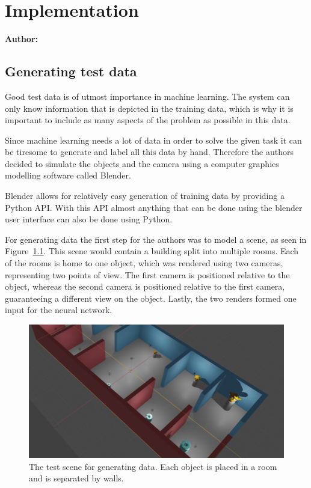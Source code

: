 \chapter{Implementation}

\textbf{Author: } 

\section{Generating test data}
Good test data is of utmost importance in machine learning. The system can only know information that is depicted in the training data, which is why it is important to include as many aspects of the problem as possible in this data.

Since machine learning needs a lot of data in order to solve the given task it can be tiresome to generate and label all this data by hand. Therefore the authors decided to simulate the objects and the camera using a computer graphics modelling software called Blender.

Blender allows for relatively easy generation of training data by providing a Python API. With this API almost anything that can be done using the blender user interface can also be done using Python.

For generating data the first step for the authors was to model a scene, as seen in Figure~\ref{pic:implementation_generatingData_blenderSetup}. This scene would contain a building split into multiple rooms. Each of the rooms is home to one object, which was rendered using two cameras, representing two points of view. The first camera is positioned relative to the object, whereas the second camera is positioned relative to the first camera, guaranteeing a different view on the object. Lastly, the two renders formed one input for the neural network.

\begin{figure}[h!]
	\centering
	\includegraphics[width=5in]{img/implementation_generatingData_blenderSetup.png}
	\caption{The test scene for generating data. Each object is placed in a room and is separated by walls.}
	\label{pic:implementation_generatingData_blenderSetup}
\end{figure}

